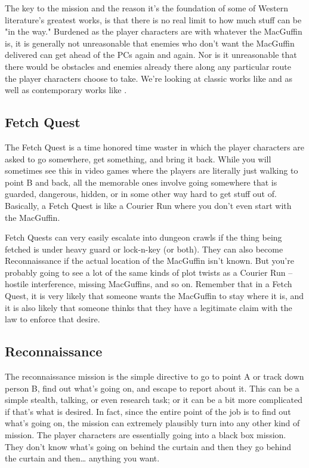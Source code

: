 The key to the mission and the reason it's the foundation of some of Western literature's greatest works, is that there is no real limit to how much stuff can be "in the way." Burdened as the player characters are with whatever the MacGuffin is, it is generally not unreasonable that enemies who don't want the MacGuffin delivered can get ahead of the PCs again and again. Nor is it unreasonable that there would be obstacles and enemies already there along any particular route the player characters choose to take. We're looking at classic works like  and  as well as contemporary works like .

\subsection{Fetch Quest}

The Fetch Quest is a time honored time waster in which the player characters are asked to go somewhere, get something, and bring it back. While you will sometimes see this in video games where the players are literally just walking to point B and back, all the memorable ones involve going somewhere that is guarded, dangerous, hidden, or in some other way hard to get stuff out of. Basically, a Fetch Quest is like a Courier Run where you don't even start with the MacGuffin. 

Fetch Quests can very easily escalate into dungeon crawls if the thing being fetched is under heavy guard or lock-n-key (or both). They can also become Reconnaissance if the actual location of the MacGuffin isn't known. But you're probably going to see a lot of the same kinds of plot twists as a Courier Run -- hostile interference, missing MacGuffins, and so on. Remember that in a Fetch Quest, it is very likely that someone wants the MacGuffin to stay where it is, and it is also likely that someone thinks that they have a legitimate claim with the law to enforce that desire.

\subsection{Reconnaissance}

The reconnaissance mission is the simple directive to go to point A or track down person B, find out what's going on, and escape to report about it. This can be a simple stealth, talking, or even research task; or it can be a bit more complicated if that's what is desired. In fact, since the entire point of the job is to find out what's going on, the mission can extremely plausibly turn into any other kind of mission. The player characters are essentially going into a black box mission. They don't know what's going on behind the curtain and then they go behind the curtain and then\ldots{} anything you want.

